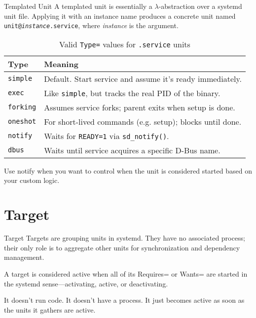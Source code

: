 \documentclass[openany, 12pt]{book}
\begin{document}
\begin{intuition}{Templated Unit}{}
  A templated unit is essentially a $\lambda$-abstraction over a systemd unit
  file. Applying it with an instance name produces a concrete unit named
  \texttt{unit@\textit{instance}.service}, where \textit{instance} is the
  argument.
\end{intuition}

\begin{table}[ht]
  \centering
  \begin{tabular}{@{}ll@{}}
    \toprule
    \textbf{Type}    & \textbf{Meaning}                                             \\
    \midrule
    \texttt{simple}  & Default. Start service and assume it's ready immediately.    \\
    \texttt{exec}    & Like \texttt{simple}, but tracks the real PID of the binary. \\
    \texttt{forking} & Assumes service forks; parent exits when setup is done.      \\
    \texttt{oneshot} & For short-lived commands (e.g. setup); blocks until done.    \\
    \texttt{notify}  & Waits for \texttt{READY=1} via \texttt{sd\_notify()}.        \\
    \texttt{dbus}    & Waits until service acquires a specific D-Bus name.          \\
    \bottomrule
  \end{tabular}
  \caption{Valid \texttt{Type=} values for \texttt{.service} units}
\end{table}

Use notify when you want to control when the unit is considered started based on
your custom logic.

\section{Target}
\begin{definition}{Target}{}
  Targets are grouping units in systemd. They have no associated process;
  their only role is to aggregate other units for synchronization and
  dependency management.
\end{definition}

A target is considered active when all of its Requires= or Wants= are started
in the systemd sense---activating, active, or deactivating.

It doesn’t run code. It doesn't have a process. It just becomes active as soon
as the units it gathers are active.
\end{document}
